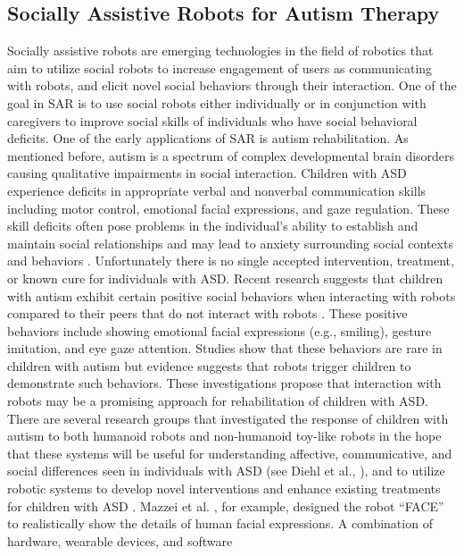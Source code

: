 \subsection{Socially Assistive Robots for Autism Therapy}
Socially assistive robots are emerging technologies in the field of robotics that aim
to utilize social robots to increase engagement of users as communicating with robots, and
elicit novel social behaviors through their interaction. One of the goal in SAR is to use
social robots either individually or in conjunction with caregivers to improve social skills
of individuals who have social behavioral deficits. One of the early applications of SAR is
autism rehabilitation. As mentioned before, autism is a spectrum of complex
developmental brain disorders causing qualitative impairments in social interaction.
Children with ASD experience deficits in appropriate verbal and nonverbal communication
skills including motor control, emotional facial expressions, and gaze regulation. These
skill deficits often pose problems in the individual’s ability to establish and maintain social
relationships and may lead to anxiety surrounding social contexts and behaviors \cite{Behavioral1964}.
Unfortunately there is no single accepted intervention, treatment, or known cure for
individuals with ASD.
Recent research suggests that children with autism exhibit certain positive social
behaviors when interacting with robots compared to their peers that do not interact with
robots \cite{RobotMovement, EnhanceEmpiri2011, DOMER2011, DefineSocial2005, SocialInteract2003}. These positive behaviors include showing emotional facial
expressions (e.g., smiling), gesture imitation, and eye gaze attention. Studies show that
these behaviors are rare in children with autism but evidence suggests that robots trigger
children to demonstrate such behaviors. These investigations propose that interaction with
robots may be a promising approach for rehabilitation of children with ASD.
There are several research groups that investigated the response of children with
autism to both humanoid robots and non-humanoid toy-like robots in the hope that these
systems will be useful for understanding affective, communicative, and social differences
seen in individuals with ASD (see Diehl et al., \cite{SocialInteract2003}), and to utilize robotic systems to develop
novel interventions and enhance existing treatments for children with ASD \cite{ASIMO2011, DSMIV2000, DoesMatter2006}.
Mazzei et al. \cite{ToInteract2004}, for example, designed the robot “FACE” to realistically show the details
of human facial expressions. A combination of hardware, wearable devices, and software
